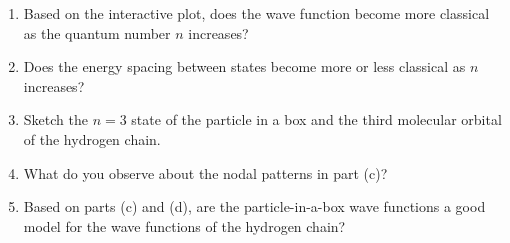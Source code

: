 \documentclass[../psets.tex]{subfiles}
\begin{document}
\begin{enumerate}
    \begin{enumerate}
        \item Based on the interactive plot, does the wave function become more classical as the quantum number $n$ increases?
        \item Does the energy spacing between states become more or less classical as $n$ increases?
        \item Sketch the $n=3$ state of the particle in a box and the third molecular orbital of the hydrogen chain.
        \item What do you observe about the nodal patterns in part (c)?
        \item Based on parts (c) and (d), are the particle-in-a-box wave functions a good model for the wave functions of the hydrogen chain?
    \end{enumerate}
\end{enumerate}
\end{document}
